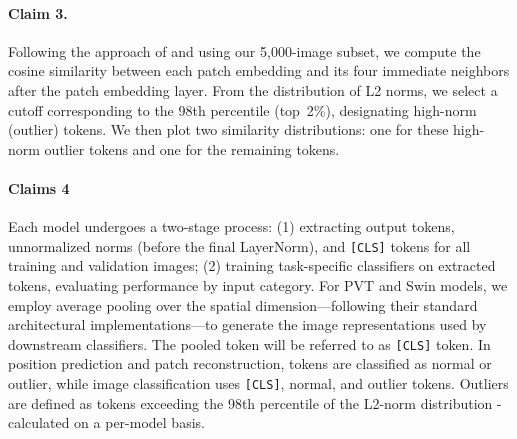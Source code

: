 \documentclass[10pt]{article} %
\begin{document}
\paragraph{Claim 3.}
Following the approach of \citet{darcet2024registers} and using our 5,000-image subset, we compute the cosine similarity between each patch embedding and its four immediate neighbors after the patch embedding layer. From the distribution of L2 norms, we select a cutoff corresponding to the 98th percentile (top~2\%), designating high-norm (outlier) tokens. We then plot two similarity distributions: one for these high-norm outlier tokens and one for the remaining tokens.

\paragraph{Claims 4}
Each model undergoes a two-stage process: (1) extracting output tokens, unnormalized norms (before the final LayerNorm), and \texttt{[CLS]} tokens for all training and validation images; (2) training task-specific classifiers on extracted tokens, evaluating performance by input category. For PVT \citep{wang2022pvt} and Swin \citep{liu2021swin} models, we employ average pooling over the spatial dimension—following their standard architectural implementations—to generate the image representations used by downstream classifiers. The pooled token will be referred to as \texttt{[CLS]} token. In position prediction and patch reconstruction, tokens are classified as normal or outlier, while image classification uses \texttt{[CLS]}, normal, and outlier tokens. Outliers are defined as tokens exceeding the 98th percentile of the L2-norm distribution - calculated on a per-model basis.
\end{document}
